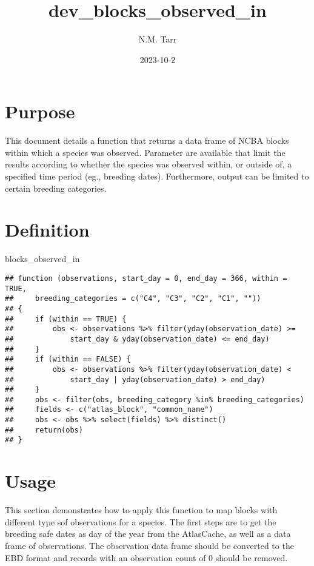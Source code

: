 \documentclass[
]{article}
\title{dev\_blocks\_observed\_in}
\author{N.M. Tarr}
\date{2023-10-2}
\newenvironment{Shaded}{\begin{snugshade}}{\end{snugshade}}
\newcommand{\NormalTok}[1]{#1}
\begin{document}
\maketitle

\section{Purpose}\label{purpose}

This document details a function that returns a data frame of NCBA
blocks within which a species was observed. Parameter are available that
limit the results according to whether the species was observed within,
or outside of, a specified time period (eg., breeding dates).
Furthermore, output can be limited to certain breeding categories.

\section{Definition}\label{definition}

\begin{Shaded}
\begin{Highlighting}[]
\NormalTok{blocks\_observed\_in}
\end{Highlighting}
\end{Shaded}

\begin{verbatim}
## function (observations, start_day = 0, end_day = 366, within = TRUE, 
##     breeding_categories = c("C4", "C3", "C2", "C1", "")) 
## {
##     if (within == TRUE) {
##         obs <- observations %>% filter(yday(observation_date) >= 
##             start_day & yday(observation_date) <= end_day)
##     }
##     if (within == FALSE) {
##         obs <- observations %>% filter(yday(observation_date) < 
##             start_day | yday(observation_date) > end_day)
##     }
##     obs <- filter(obs, breeding_category %in% breeding_categories)
##     fields <- c("atlas_block", "common_name")
##     obs <- obs %>% select(fields) %>% distinct()
##     return(obs)
## }
\end{verbatim}

\section{Usage}\label{usage}

This section demonstrates how to apply this function to map blocks with
different type sof observations for a species. The first steps are to
get the breeding safe dates as day of the year from the AtlasCache, as
well as a data frame of observations. The observation data frame should
be converted to the EBD format and records with an observation count of
0 should be removed.
\end{document}
